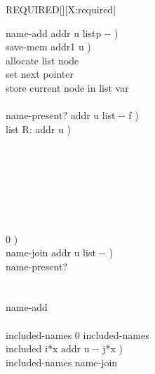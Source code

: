 \begin{worddef}{}{REQUIRED}[][X:required]
\begin{implement}
		\word{:} name-add  addr u listp -{}- ) \\
		\tab {} save-mem  addr1 u ) \\
		     allocate list node \\
		\tab {}   \word{!}  set next pointer \\
		\tab {}  \word{!}  store current node in list var \\
		\tab {}  \word{;} \\

		\word{:} name-present?  addr u list -{}- f ) \\
		\tab \word{ROT}     list R: addr u ) \\
		\tab[2]  \\
		\tab {} \\
		\tab[2]        \\
		\tab[3]		     \\
		\tab[2]	 \\
		\tab[2]  \\
		\tab {} \\
		\tab {}  0 )   \word{;} \\

		\word{:} name-join  addr u list -{}- ) \\
		\tab {}    name-present?  \\
		\tab[2]    \\
	    \tab {} \\
		\tab[2]  name-add \\
		\tab {} \word{;} \\

		 included-names 0 included-names \word{!} \\

		\word{:} included  i*x addr u -{}- j*x ) \\
		\tab {} included-names name-join \\
		\tab {} \word{;} \\


\end{implement}
\end{worddef}
